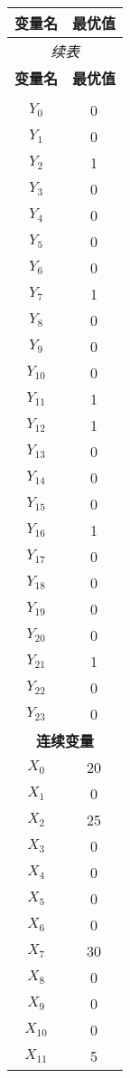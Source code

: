 \documentclass[a4paper,10pt]{article}
\begin{document}
\begin{center}
\begin{longtable}{cc}
\toprule
\textbf{变量名} & \textbf{最优值} \\
\midrule
\endfirsthead
\multicolumn{2}{c}{\textit{续表}} \\
\toprule
\textbf{变量名} & \textbf{最优值} \\
\midrule
\endhead
\bottomrule
\endfoot
\bottomrule
\endlastfoot
\multicolumn{2}{c}{\textbf{二元变量}} \\
\midrule
$Y_{0}$ & 0 \\
$Y_{1}$ & 0 \\
$Y_{2}$ & 1 \\
$Y_{3}$ & 0 \\
$Y_{4}$ & 0 \\
$Y_{5}$ & 0 \\
$Y_{6}$ & 0 \\
$Y_{7}$ & 1 \\
$Y_{8}$ & 0 \\
$Y_{9}$ & 0 \\
$Y_{10}$ & 0 \\
$Y_{11}$ & 1 \\
$Y_{12}$ & 1 \\
$Y_{13}$ & 0 \\
$Y_{14}$ & 0 \\
$Y_{15}$ & 0 \\
$Y_{16}$ & 1 \\
$Y_{17}$ & 0 \\
$Y_{18}$ & 0 \\
$Y_{19}$ & 0 \\
$Y_{20}$ & 0 \\
$Y_{21}$ & 1 \\
$Y_{22}$ & 0 \\
$Y_{23}$ & 0 \\
\midrule
\multicolumn{2}{c}{\textbf{连续变量}} \\
\midrule
$X_{0}$ & 20 \\
$X_{1}$ & 0 \\
$X_{2}$ & 25 \\
$X_{3}$ & 0 \\
$X_{4}$ & 0 \\
$X_{5}$ & 0 \\
$X_{6}$ & 0 \\
$X_{7}$ & 30 \\
$X_{8}$ & 0 \\
$X_{9}$ & 0 \\
$X_{10}$ & 0 \\
$X_{11}$ & 5 \\

\end{longtable}
\end{center}
\end{document}
